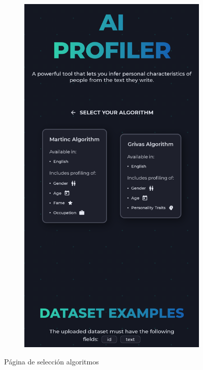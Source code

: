 \begin{figure}[H]
\begin{subfigure}[c]{0.21\textwidth}
			\includegraphics[width=\textwidth]{imagenes/algorithms_movil.png}
			\label{fig:casouso_algorithms_movil}
	\end{subfigure}
	\vspace{-1\baselineskip}
	\caption{Página de selección algoritmos}
	\label{fig:casouso_algorithms}
\end{figure}


